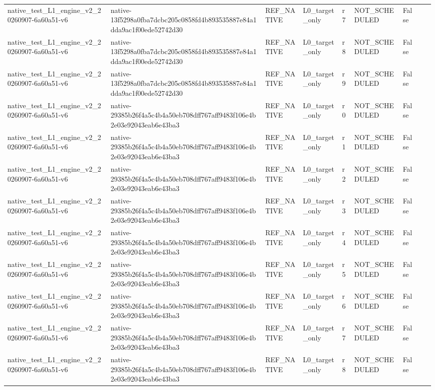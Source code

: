 \begin{tabular}{lllllllll}
native\_test\_L1\_engine\_v2\_20260907-6a60a51-v6 & native-13f5298a0fba7dcbc205c0858fd4b893535887e84a1dda9ac1f00ede52742d30 & REF\_NATIVE & L0\_target\_only & r7 & NOT\_SCHEDULED & False &  &  \\
native\_test\_L1\_engine\_v2\_20260907-6a60a51-v6 & native-13f5298a0fba7dcbc205c0858fd4b893535887e84a1dda9ac1f00ede52742d30 & REF\_NATIVE & L0\_target\_only & r8 & NOT\_SCHEDULED & False &  &  \\
native\_test\_L1\_engine\_v2\_20260907-6a60a51-v6 & native-13f5298a0fba7dcbc205c0858fd4b893535887e84a1dda9ac1f00ede52742d30 & REF\_NATIVE & L0\_target\_only & r9 & NOT\_SCHEDULED & False &  &  \\
native\_test\_L1\_engine\_v2\_20260907-6a60a51-v6 & native-29385b26f4a5c4b4a50eb708dff767aff9483f106e4b2e03e92043eab6e43ba3 & REF\_NATIVE & L0\_target\_only & r0 & NOT\_SCHEDULED & False &  &  \\
native\_test\_L1\_engine\_v2\_20260907-6a60a51-v6 & native-29385b26f4a5c4b4a50eb708dff767aff9483f106e4b2e03e92043eab6e43ba3 & REF\_NATIVE & L0\_target\_only & r1 & NOT\_SCHEDULED & False &  &  \\
native\_test\_L1\_engine\_v2\_20260907-6a60a51-v6 & native-29385b26f4a5c4b4a50eb708dff767aff9483f106e4b2e03e92043eab6e43ba3 & REF\_NATIVE & L0\_target\_only & r2 & NOT\_SCHEDULED & False &  &  \\
native\_test\_L1\_engine\_v2\_20260907-6a60a51-v6 & native-29385b26f4a5c4b4a50eb708dff767aff9483f106e4b2e03e92043eab6e43ba3 & REF\_NATIVE & L0\_target\_only & r3 & NOT\_SCHEDULED & False &  &  \\
native\_test\_L1\_engine\_v2\_20260907-6a60a51-v6 & native-29385b26f4a5c4b4a50eb708dff767aff9483f106e4b2e03e92043eab6e43ba3 & REF\_NATIVE & L0\_target\_only & r4 & NOT\_SCHEDULED & False &  &  \\
native\_test\_L1\_engine\_v2\_20260907-6a60a51-v6 & native-29385b26f4a5c4b4a50eb708dff767aff9483f106e4b2e03e92043eab6e43ba3 & REF\_NATIVE & L0\_target\_only & r5 & NOT\_SCHEDULED & False &  &  \\
native\_test\_L1\_engine\_v2\_20260907-6a60a51-v6 & native-29385b26f4a5c4b4a50eb708dff767aff9483f106e4b2e03e92043eab6e43ba3 & REF\_NATIVE & L0\_target\_only & r6 & NOT\_SCHEDULED & False &  &  \\
native\_test\_L1\_engine\_v2\_20260907-6a60a51-v6 & native-29385b26f4a5c4b4a50eb708dff767aff9483f106e4b2e03e92043eab6e43ba3 & REF\_NATIVE & L0\_target\_only & r7 & NOT\_SCHEDULED & False &  &  \\
native\_test\_L1\_engine\_v2\_20260907-6a60a51-v6 & native-29385b26f4a5c4b4a50eb708dff767aff9483f106e4b2e03e92043eab6e43ba3 & REF\_NATIVE & L0\_target\_only & r8 & NOT\_SCHEDULED & False &  &  \\

\end{tabular}
